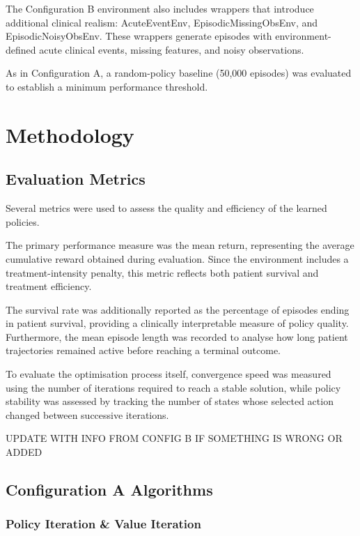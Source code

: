 \documentclass[11pt,a4paper]{article}
\begin{document}
The Configuration B environment also includes wrappers that introduce additional clinical realism: 
AcuteEventEnv, EpisodicMissingObsEnv, and EpisodicNoisyObsEnv. 
These wrappers generate episodes with environment-defined acute clinical events, missing features, and noisy observations. 

As in Configuration A, a random-policy baseline (50,000 episodes) was evaluated to establish a minimum performance threshold.  

\section{Methodology}
\subsection{Evaluation Metrics}

Several metrics were used to assess the quality and efficiency of the learned policies. 

The primary performance measure was the mean return, representing the average cumulative reward obtained during evaluation. 
Since the environment includes a treatment-intensity penalty, this metric reflects both patient survival and treatment efficiency.

The survival rate was additionally reported as the percentage of episodes ending in patient survival, 
providing a clinically interpretable measure of policy quality. 
Furthermore, the mean episode length was recorded to analyse how long patient trajectories remained active before reaching a terminal outcome.

To evaluate the optimisation process itself, 
convergence speed was measured using the number of iterations required to reach a stable solution, 
while policy stability was assessed by tracking the number of states whose selected action changed between successive iterations. 

UPDATE WITH INFO FROM CONFIG B IF SOMETHING IS WRONG OR ADDED


\subsection{Configuration A Algorithms}

\subsubsection{Policy Iteration \& Value Iteration}
\end{document}

